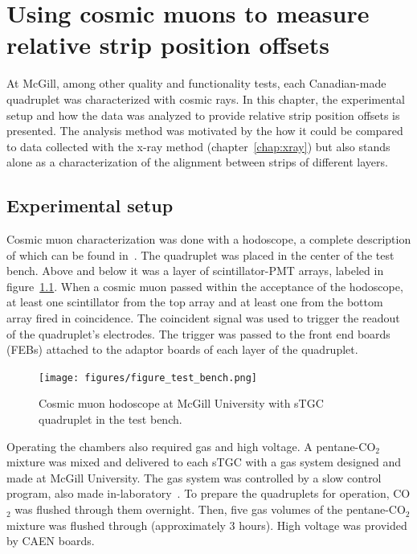 
\chapter{Using cosmic muons to measure relative strip position offsets}
\label{chap:cosmics}

At McGill, among other quality and functionality tests, each Canadian-made quadruplet was characterized with cosmic rays. In this chapter, the experimental setup and how the data was analyzed to provide relative strip position offsets is presented. The analysis method was motivated by the how it could be compared to data collected with the x-ray method (chapter~\ref{chap:xray}) but also stands alone as a characterization of the alignment between strips of different layers.

\section{Experimental setup}

Cosmic muon characterization was done with a hodoscope, a complete description of which can be found in~\cite{lefebvre_thesis}.  The quadruplet was placed in the center of the test bench. Above and below it was a layer of scintillator-PMT arrays, labeled in figure~\ref{fig:hodoscope}. When a cosmic muon passed within the acceptance of the hodoscope, at least one scintillator from the top array and at least one from the bottom array fired in coincidence. The coincident signal was used to trigger the readout of the quadruplet's electrodes. The trigger was passed to the front end boards (FEBs) attached to the adaptor boards of each layer of the quadruplet.

\begin{figure}
    \centering
    \texttt{[image: figures/figure\_test\_bench.png]}
    \caption{Cosmic muon hodoscope at McGill University with sTGC quadruplet in the test bench.}
    \label{fig:hodoscope}
\end{figure}

Operating the chambers also required gas and high voltage. A pentane-CO$_{2}$ mixture was mixed and delivered to each sTGC with a gas system designed and made at McGill University. The gas system was controlled by a slow control program, also made in-laboratory~\cite{keyes_development_2017}. To prepare the quadruplets for operation, CO$_{2}$ was flushed through them overnight. Then, five gas volumes of the pentane-CO$_{2}$ mixture was flushed through (approximately 3 hours). High voltage was provided by CAEN boards. 

